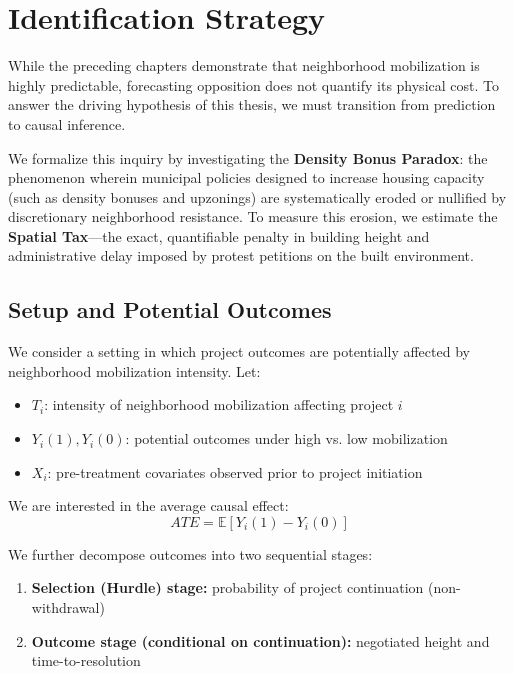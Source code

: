 \documentclass[11pt, letterpaper, oneside]{article}
\begin{document}
\section{Identification Strategy}

While the preceding chapters demonstrate that neighborhood mobilization is highly predictable, forecasting opposition does not quantify its physical cost. To answer the driving hypothesis of this thesis, we must transition from prediction to causal inference. 

We formalize this inquiry by investigating the \textbf{Density Bonus Paradox}: the phenomenon wherein municipal policies designed to increase housing capacity (such as density bonuses and upzonings) are systematically eroded or nullified by discretionary neighborhood resistance. To measure this erosion, we estimate the \textbf{Spatial Tax}---the exact, quantifiable penalty in building height and administrative delay imposed by protest petitions on the built environment. 

\subsection{Setup and Potential Outcomes}

We consider a setting in which project outcomes are potentially affected by neighborhood mobilization intensity. Let:
\begin{itemize}
    \item $T_i$: intensity of neighborhood mobilization affecting project $i$
    \item $Y_i(1), Y_i(0)$: potential outcomes under high vs. low mobilization
    \item $X_i$: pre-treatment covariates observed prior to project initiation
\end{itemize}

We are interested in the average causal effect:
\begin{equation}
ATE = \mathbb{E}[Y_i(1) - Y_i(0)]
\end{equation}

We further decompose outcomes into two sequential stages:
\begin{enumerate}
    \item \textbf{Selection (Hurdle) stage:} probability of project continuation (non-withdrawal)
    \item \textbf{Outcome stage (conditional on continuation):} negotiated height and time-to-resolution
\end{enumerate}
\end{document}
